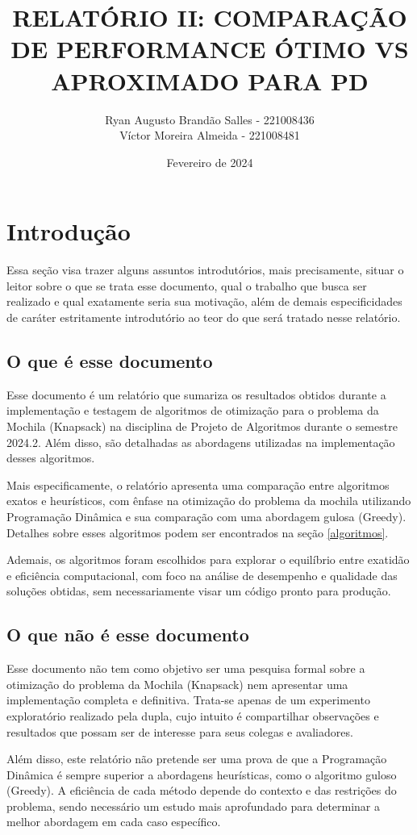 \documentclass{article}
\title{RELATÓRIO II: COMPARAÇÃO DE PERFORMANCE ÓTIMO VS APROXIMADO PARA PD}
\author{
    Ryan Augusto Brandão Salles - 221008436\\
    Víctor Moreira Almeida - 221008481\\
}
\date{Fevereiro de 2024}
\begin{document}
\maketitle

\section{Introdução}
Essa seção visa trazer alguns assuntos introdutórios, mais precisamente, situar o leitor sobre o que se trata esse documento, qual o trabalho que busca ser realizado e qual exatamente seria sua motivação, além de demais especificidades de caráter estritamente introdutório ao teor do que será tratado nesse relatório.

\subsection{O que é esse documento}
Esse documento é um relatório que sumariza os resultados obtidos durante a implementação e testagem de algoritmos de otimização para o problema da Mochila (Knapsack) na disciplina de Projeto de Algoritmos durante o semestre 2024.2. Além disso, são detalhadas as abordagens utilizadas na implementação desses algoritmos.

Mais especificamente, o relatório apresenta uma comparação entre algoritmos exatos e heurísticos, com ênfase na otimização do problema da mochila utilizando Programação Dinâmica e sua comparação com uma abordagem gulosa (Greedy). Detalhes sobre esses algoritmos podem ser encontrados na seção \ref{algoritmos}.

Ademais, os algoritmos foram escolhidos para explorar o equilíbrio entre exatidão e eficiência computacional, com foco na análise de desempenho e qualidade das soluções obtidas, sem necessariamente visar um código pronto para produção.

\subsection{O que não é esse documento}
Esse documento não tem como objetivo ser uma pesquisa formal sobre a otimização do problema da Mochila (Knapsack) nem apresentar uma implementação completa e definitiva. Trata-se apenas de um experimento exploratório realizado pela dupla, cujo intuito é compartilhar observações e resultados que possam ser de interesse para seus colegas e avaliadores.

Além disso, este relatório não pretende ser uma prova de que a Programação Dinâmica é sempre superior a abordagens heurísticas, como o algoritmo guloso (Greedy). A eficiência de cada método depende do contexto e das restrições do problema, sendo necessário um estudo mais aprofundado para determinar a melhor abordagem em cada caso específico.
\end{document}
